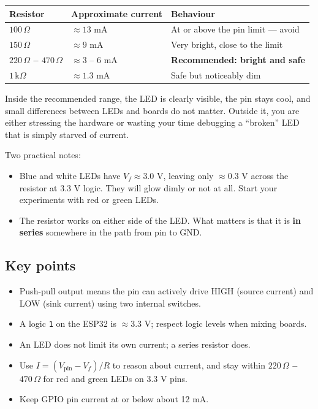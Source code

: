 \documentclass[11pt]{article}
\begin{document}
\begin{table}[htbp]
\centering
\renewcommand{\arraystretch}{1.3}
\begin{tabularx}{\textwidth}{@{}X X X@{}}
\toprule
\textbf{Resistor} & \textbf{Approximate current} & \textbf{Behaviour} \\
\midrule
$100\,\Omega$ & $\approx 13$ mA & At or above the pin limit --- avoid \\
$150\,\Omega$ & $\approx 9$ mA & Very bright, close to the limit \\
\textbf{$220\,\Omega$ -- $470\,\Omega$} & $\approx 3$ -- $6$ mA & \textbf{Recommended: bright and safe} \\
$1\,\mathrm{k}\Omega$ & $\approx 1.3$ mA & Safe but noticeably dim \\
\bottomrule
\end{tabularx}
\end{table}

Inside the recommended range, the LED is clearly visible, the pin stays cool, and small differences between LEDs and boards do not matter. Outside it, you are either stressing the hardware or wasting your time debugging a ``broken'' LED that is simply starved of current.

Two practical notes:

\begin{itemize}
    \item Blue and white LEDs have $V_f \approx 3.0$ V, leaving only $\approx 0.3$ V across the resistor at 3.3 V logic. They will glow dimly or not at all. Start your experiments with red or green LEDs.
    
    \item The resistor works on either side of the LED. What matters is that it is \textbf{in series} somewhere in the path from pin to GND.
\end{itemize}

\subsection{Key points}

\begin{itemize}
    \item Push-pull output means the pin can actively drive HIGH (source current) and LOW (sink current) using two internal switches.
    
    \item A logic \texttt{1} on the ESP32 is $\approx 3.3$ V; respect logic levels when mixing boards.
    
    \item An LED does not limit its own current; a series resistor does.
    
    \item Use $I = (V_{\mathrm{pin}} - V_f) / R$ to reason about current, and stay within \textbf{$220\,\Omega$ -- $470\,\Omega$} for red and green LEDs on 3.3 V pins.
    
    \item Keep GPIO pin current at or below about 12 mA.
\end{itemize}
\end{document}
